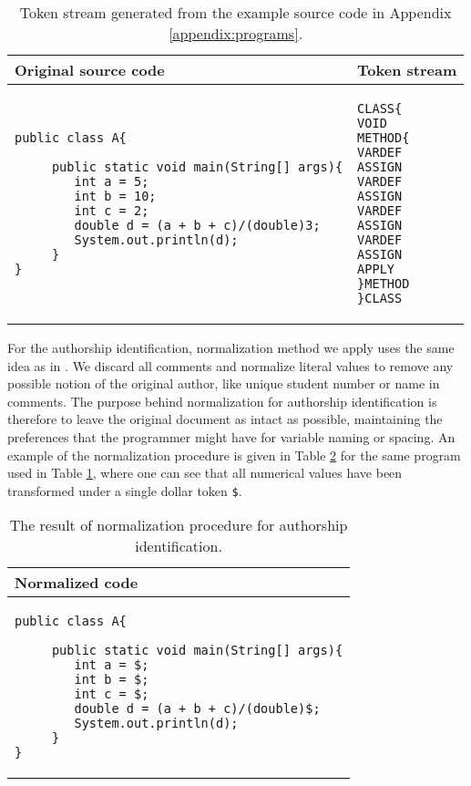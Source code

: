 \begin{table}[ht]
\centering
\caption{Token stream generated from the example source code in Appendix \ref{appendix:programs}.}
\label{tbl-token-stream}
\begin{tabular}{|l|l|} \hline
\bf Original source code & \bf Token stream \\ \hline
\begin{lstlisting}
public class A{

     public static void main(String[] args){
        int a = 5;
        int b = 10;
        int c = 2;
        double d = (a + b + c)/(double)3;
        System.out.println(d);
     }
}
\end{lstlisting}                     &

\begin{lstlisting}
CLASS{  
VOID    
METHOD{ 
VARDEF 
ASSIGN  
VARDEF 
ASSIGN  
VARDEF 
ASSIGN  
VARDEF 
ASSIGN  
APPLY   
}METHOD 
}CLASS
\end{lstlisting}
\\ \hline      
\end{tabular}
\end{table}

\newpage

For the authorship identification, normalization method we apply uses the same idea as in \cite{AIRTSCAA2009, SCANG2007}. We discard all comments and normalize literal values to remove any possible notion of the original author, like unique student number or name in comments. The purpose behind normalization for authorship identification is therefore to leave the original document as intact as possible, maintaining the preferences that the programmer might have for \eg variable naming or spacing. An example of the normalization procedure is given in Table \ref{tbl-ai-normalization} for the same program used in Table \ref{tbl-token-stream}, where one can see that all numerical values have been transformed under a single dollar token \texttt{\$}.

\begin{table}[ht]
\centering
\caption{The result of normalization procedure for authorship identification.}
\label{tbl-ai-normalization}
\begin{tabular}{|l|} \hline
\bf Normalized code \\ \hline
\begin{lstlisting}
public class A{

     public static void main(String[] args){
        int a = $;
        int b = $;
        int c = $;
        double d = (a + b + c)/(double)$; 
        System.out.println(d);
     }
}
\end{lstlisting} 

\\ \hline      
\end{tabular}
\end{table}

